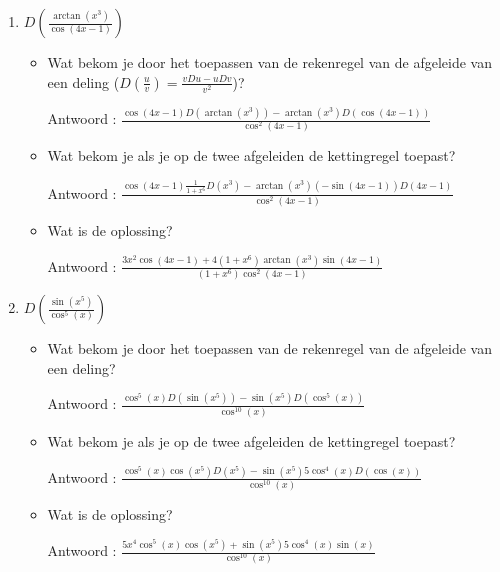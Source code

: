 \documentclass{article}
\begin{document}
\begin{enumerate}
\begin{itemize}
\end{itemize}

\item $D \left( \frac{\arctan \left( x^3  \right)}{\cos (4x-1)}  \right)$

\begin{itemize}

\item Wat bekom je door het toepassen van de rekenregel van de afgeleide van een deling ($D \left(  \frac{u}{v} \right)=\frac {vDu-uDv}{v^2}$)?

Antwoord : $\frac {\cos (4x-1) D \left(  \arctan \left( x^3 \right)  \right)-\arctan \left( x^3 \right)D\left( \cos (4x-1)  \right)}{\cos ^2(4x-1)}$

\item Wat bekom je als je op de twee afgeleiden de kettingregel toepast?

Antwoord : $\frac {\cos (4x-1) \frac{1}{1+x^6}D\left( x^3 \right)-\arctan \left( x^3 \right)\left(- \sin (4x-1)  \right)D(4x-1)}{\cos ^2(4x-1)}$

\item Wat is de oplossing?

Antwoord : $\frac {3x^2\cos (4x-1) +4(1+x^6)\arctan \left( x^3 \right) \sin (4x-1)}{(1+x^6)\cos ^2(4x-1)}$

\end{itemize}

\item $D \left(  \frac{\sin \left( x^5  \right)}{\cos ^5 (x)}  \right)$

\begin{itemize}

\item Wat bekom je door het toepassen van de rekenregel van de afgeleide van een deling?

Antwoord : $\frac {\cos ^5(x)D\left( \sin \left(  x^5  \right)  \right)-\sin \left(  x^5 \right)D\left( \cos^5(x)  \right)}{\cos ^{10}(x)}$

\item Wat bekom je als je op de twee afgeleiden de kettingregel toepast?

Antwoord : $\frac {\cos ^5(x) \cos \left(  x^5  \right) D\left( x^5 \right)-\sin \left(  x^5 \right)5 \cos^4(x) D(\cos (x))}{\cos ^{10}(x)}$

\item Wat is de oplossing?

Antwoord : $\frac {5x^4\cos ^5(x) \cos \left(  x^5  \right)+\sin \left(  x^5 \right)5 \cos^4(x) \sin (x)}{\cos ^{10}(x)}$

\end{itemize}


\end{enumerate}
\end{document}

